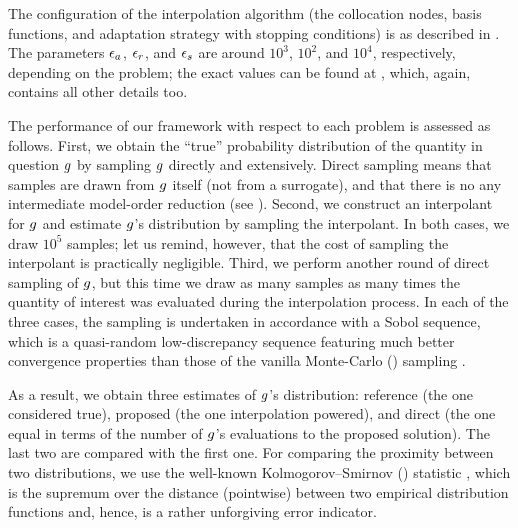 The configuration of the interpolation algorithm (the collocation nodes, basis
functions, and adaptation strategy with stopping conditions) is as described in
. The parameters $\epsilon_a$, $\epsilon_r$, and $\epsilon_s$ are
around $10^3$, $10^2$, and $10^4$, respectively, depending on the problem; the
exact values can be found at \cite{sources}, which, again, contains all other
details too.

The performance of our framework with respect to each problem is assessed as
follows. First, we obtain the ``true'' probability distribution of the quantity
in question $g$ by sampling $g$ directly and extensively. Direct sampling
means that samples are drawn from $g$ itself (not from a surrogate), and that
there is no any intermediate model-order reduction (see ).
Second, we construct an interpolant for $g$ and estimate $g$'s distribution by
sampling the interpolant. In both cases, we draw $10^5$ samples; let us remind,
however, that the cost of sampling the interpolant is practically negligible.
Third, we perform another round of direct sampling of $g$, but this time we
draw as many samples as many times the quantity of interest was evaluated during
the interpolation process. In each of the three cases, the sampling is
undertaken in accordance with a Sobol sequence, which is a quasi-random
low-discrepancy sequence featuring much better convergence properties than those
of the vanilla Monte-Carlo () sampling \cite{joe2008}.

As a result, we obtain three estimates of $g$'s distribution: reference (the
one considered true), proposed (the one interpolation powered), and direct (the
one equal in terms of the number of $g$'s evaluations to the proposed
solution). The last two are compared with the first one. For comparing the
proximity between two distributions, we use the well-known Kolmogorov--Smirnov
() statistic \cite{rao2009}, which is the supremum over the distance
(pointwise) between two empirical distribution functions and, hence, is a rather
unforgiving error indicator.
